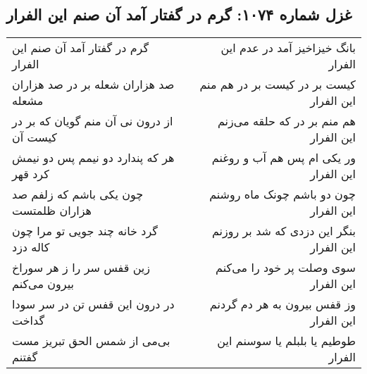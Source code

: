 \begin{center}
\section*{غزل شماره ۱۰۷۴: گرم در گفتار آمد آن صنم این الفرار}
\label{sec:1074}
\begin{longtable}{l p{0.5cm} r}
گرم در گفتار آمد آن صنم این الفرار
&&
بانگ خیزاخیز آمد در عدم این الفرار
\\
صد هزاران شعله بر در صد هزاران مشعله
&&
کیست بر در کیست بر در هم منم این الفرار
\\
از درون نی آن منم گویان که بر در کیست آن
&&
هم منم بر در که حلقه می‌زنم این الفرار
\\
هر که پندارد دو نیمم پس دو نیمش کرد قهر
&&
ور یکی ام پس هم آب و روغنم این الفرار
\\
چون یکی باشم که زلفم صد هزاران ظلمتست
&&
چون دو باشم چونک ماه روشنم این الفرار
\\
گرد خانه چند جویی تو مرا چون کاله دزد
&&
بنگر این دزدی که شد بر روزنم این الفرار
\\
زین قفس سر را ز هر سوراخ بیرون می‌کنم
&&
سوی وصلت پر خود را می‌کنم این الفرار
\\
در درون این قفس تن در سر سودا گداخت
&&
وز قفس بیرون به هر دم گردنم این الفرار
\\
بی‌می از شمس الحق تبریز مست گفتنم
&&
طوطیم یا بلبلم یا سوسنم این الفرار
\\
\end{longtable}
\end{center}
